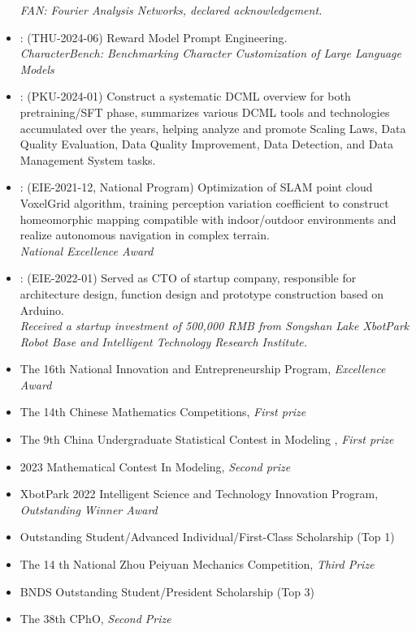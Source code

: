 \documentclass[zh]{resume}
\begin{document}
\begin{itemize}
    \textit{FAN: Fourier Analysis Networks, declared acknowledgement.}
  \item {}:
    (THU-2024-06) Reward Model Prompt Engineering. \\
    \textit{CharacterBench: Benchmarking Character Customization of Large Language Models}
  \item {}:
    (PKU-2024-01)
    Construct a systematic DCML overview for both pretraining/SFT phase, summarizes various DCML tools and technologies accumulated over the years, helping analyze and promote Scaling Laws, Data Quality Evaluation, Data Quality Improvement, Data Detection, and Data Management System tasks.
  \item {}:
    (EIE-2021-12, National Program)
    Optimization of SLAM point cloud VoxelGrid algorithm, training perception variation coefficient to construct homeomorphic mapping compatible with indoor/outdoor environments and realize autonomous navigation in complex terrain.\\
    \textit{National Excellence Award}
  \item {}:
    (EIE-2022-01)
    Served as CTO of startup company, responsible for architecture design, function design and prototype construction based on Arduino. \\
    \textit{Received a startup investment of 500,000 RMB from Songshan Lake XbotPark Robot Base and Intelligent Technology Research Institute.}
\end{itemize}

\begin{itemize}
  \item The 16th National Innovation and Entrepreneurship Program, \textit{Excellence Award}
  \item The 14th Chinese Mathematics Competitions, \textit{First prize}
  \item The 9th China Undergraduate Statistical Contest in Modeling , \textit{First prize}
  \item 2023 Mathematical Contest In Modeling, \textit{Second prize} 
  \item XbotPark 2022 Intelligent Science and Technology Innovation Program, \textit{Outstanding Winner Award}
  \item Outstanding Student/Advanced Individual/First-Class Scholarship (Top 1)
  \item The 14 th National Zhou Peiyuan Mechanics Competition, \textit{Third Prize}
  \item BNDS Outstanding Student/President Scholarship (Top 3)
  \item The 38th CPhO, \textit{Second Prize}
\end{itemize}
\end{document}
